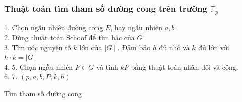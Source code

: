 \documentclass [xcolor=svgnames, t] {beamer}
\theoremstyle{definition}
\begin{document}
\begin{frame}
    \fontsize{10pt}{12pt}
    \selectfont
    \frametitle{Thuật toán tìm tham số đường cong trên trường $\mathbb{F}_p$}

    \begin{algorithm}[H]
        \Begin
        {
            1. Chọn ngẫu nhiên đường cong $E$, hay ngẫu nhiên $a,b$  \\
            2. Dùng thuật toán Schoof \cite{schoof1995counting} để tìm bậc của $G$ \\
            3. Tìm ước nguyên tố $k$ lớn của $\mid G \mid$. Đảm bảo $h$ đủ nhỏ và $k$ đủ lớn với $h \cdot k = \mid G \mid$ \\
            4. 
            5. Chọn ngẫu nhiên $P \in G$ và tính $kP$ bằng thuật toán nhân đôi và cộng. \\
            6. 
            7. \Return $(p, a, b, P, k, h)$
        }
        \caption{Tìm tham số đường cong}
    \end{algorithm}

\end{frame}
\end{document}
